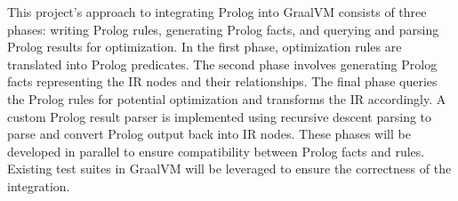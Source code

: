 This project's approach to integrating Prolog into GraalVM consists of three phases: writing Prolog rules, generating Prolog facts, and querying and parsing Prolog results for optimization. In the first phase, optimization rules are translated into Prolog predicates. The second phase involves generating Prolog facts representing the IR nodes and their relationships. The final phase queries the Prolog rules for potential optimization and transforms the IR accordingly. A custom Prolog result parser is implemented using recursive descent parsing to parse and convert Prolog output back into IR nodes. These phases will be developed in parallel to ensure compatibility between Prolog facts and rules. Existing test suites in GraalVM will be leveraged to ensure the correctness of the integration.\\
